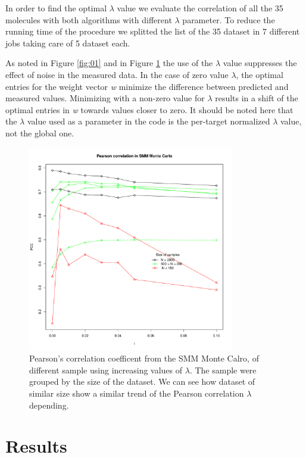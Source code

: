 \documentclass{bioinfo}
\begin{document}
\begin{application}
\par In order to find the optimal $\lambda$ value we evaluate the correlation of all the 35 molecules with both algorithms with different $\lambda$ parameter. To reduce the running time of the procedure we splitted the list of the 35 dataset in 7 different jobs taking care of 5 dataset each. 
\par As noted in Figure \ref{fig:01} and in Figure \ref{fig:02} the use of the $\lambda$ value suppresses the effect of noise in the measured data. In the case of zero value $\lambda$, the optimal entries for the weight vector \textit{w} minimize the difference between predicted and measured values.  Minimizing with a non-zero value for $\lambda$ results in a shift of the optimal entries in \textit{w} towards values closer to zero. It should be noted here that the $\lambda$ value used as a parameter in the code is the per-target normalized $\lambda$ value, not the global one.

\begin{figure}[!tpb]
\centerline{\includegraphics[width=9cm]{fig/smm_mc_l005_ppc_size.pdf}}
\caption{Pearson's correlation coefficent from the SMM Monte Calro, of different sample using increasing values of $\lambda$. The sample were grouped by the size of the dataset. We can see how dataset of similar size show a similar trend of the Pearson correlation $\lambda$ depending.}
\label{fig:02}
\end{figure}

\section*{Results}


\end{application}
\end{document}
